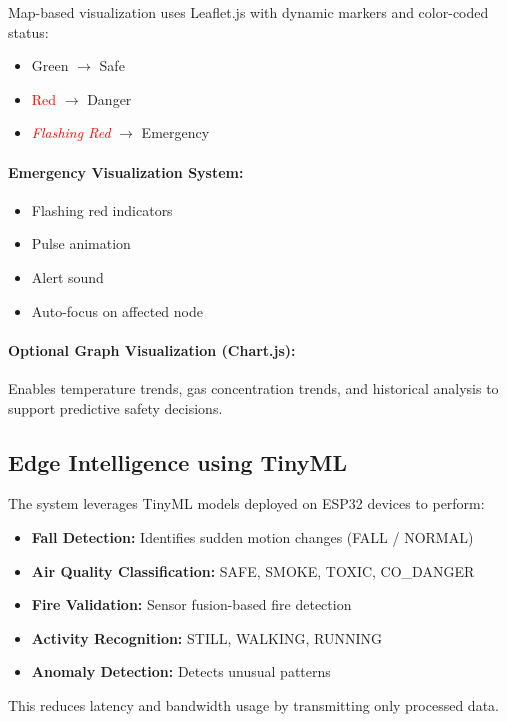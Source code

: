 \documentclass[12pt,a4paper]{article}
\begin{document}
	Map-based visualization uses Leaflet.js with dynamic markers and color-coded status:
	\begin{itemize}
		\item \textcolor{green!60!black}{Green} $\rightarrow$ Safe
		\item \textcolor{red}{Red} $\rightarrow$ Danger
		\item \textcolor{red}{\textit{Flashing Red}} $\rightarrow$ Emergency
	\end{itemize}
	
	\paragraph{Emergency Visualization System:}
	\begin{itemize}
		\item Flashing red indicators
		\item Pulse animation
		\item Alert sound
		\item Auto-focus on affected node
	\end{itemize}
	
	\paragraph{Optional Graph Visualization (Chart.js):}
	Enables temperature trends, gas concentration trends, and historical analysis to support predictive safety decisions.
	
	\subsection{Edge Intelligence using TinyML}
	The system leverages TinyML models deployed on ESP32 devices to perform:
	\begin{itemize}
		\item \textbf{Fall Detection:} Identifies sudden motion changes (FALL / NORMAL)
		\item \textbf{Air Quality Classification:} SAFE, SMOKE, TOXIC, CO\_DANGER
		\item \textbf{Fire Validation:} Sensor fusion-based fire detection
		\item \textbf{Activity Recognition:} STILL, WALKING, RUNNING
		\item \textbf{Anomaly Detection:} Detects unusual patterns
	\end{itemize}
	This reduces latency and bandwidth usage by transmitting only processed data.
	
\end{document}
